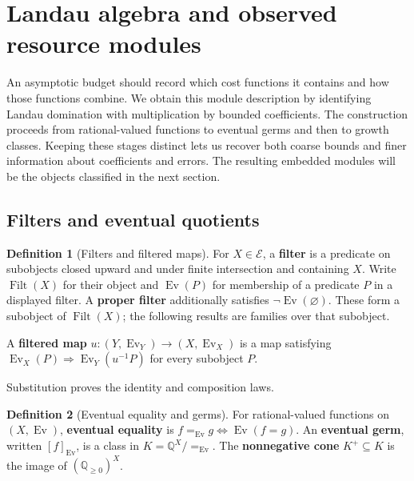 \documentclass[11pt,a4paper]{article}
\numberwithin{algorithm}{section}
\numberwithin{equation}{section}
\theoremstyle{definition}
\newtheorem{definition}[definition]{Definition}
\theoremstyle{remark}
\theoremstyle{plain}
\newcommand{\E}{\mathcal E}
\newcommand{\QQ}{\mathbb Q}
\newcommand{\Qplus}{{\QQ_{\ge0}}}
\newcommand{\Ev}{{\operatorname{Ev}}}
\theoremstyle{definition}
\theoremstyle{plain}
\begin{document}
\section{Landau algebra and observed resource modules}
\label{sec:landau-algebra}

An asymptotic budget should record which cost functions it contains and
how those functions combine. We obtain this module description by
identifying Landau domination with multiplication by bounded
coefficients. The construction proceeds from rational-valued functions to eventual
germs and then to growth classes. Keeping these stages distinct lets
us recover both coarse bounds and finer information about coefficients
and errors. The resulting embedded modules will be the objects
classified in the next section.
\subsection{Filters and eventual quotients}


\begin{definition}[Filters and filtered maps]\label{def:filtered-inputs}
For $X\in\E$, a \textbf{filter} is a predicate
on subobjects closed upward and under finite intersection and
containing $X$. Write $\operatorname{Filt}(X)$ for their object
and $\Ev(P)$ for membership of a predicate $P$ in a displayed
filter. A \textbf{proper filter} additionally satisfies
$\neg\Ev(\varnothing)$. These form a subobject of
$\operatorname{Filt}(X)$; the following results are families
over that subobject.

A \textbf{filtered map} $u:(Y,\Ev_Y)\to(X,\Ev_X)$ is a map satisfying
$\Ev_X(P)\Rightarrow\Ev_Y(u^{-1}P)$ for every subobject $P$.

\end{definition}

Substitution proves the identity and composition laws.


\begin{definition}[Eventual equality and germs]\label{def:eventual-germs}
For rational-valued functions on $(X,\Ev)$, \textbf{eventual equality}
is $f=_{\Ev}g\iff\Ev(f=g)$. An \textbf{eventual germ}, written
$[f]_{\Ev}$, is a class in $K=\QQ^X/{=_{\Ev}}$.
The \textbf{nonnegative cone} $K^+\subseteq K$ is the image of
$(\Qplus)^X$.
\end{definition}
\end{document}
